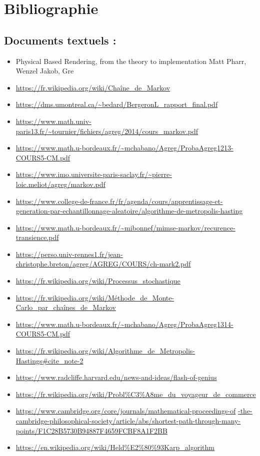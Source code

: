 \documentclass{article}
\begin{document}
\newpage
\section{Bibliographie}

\subsection{Documents textuels :}
\begin{itemize}
    \item Physical Based Rendering, from the theory to implementation Matt Pharr, Wenzel Jakob, Gre
    \item \url{https://fr.wikipedia.org/wiki/Chaîne_de_Markov}
    \item \url{https://dms.umontreal.ca/~bedard/BergeronL_rapport_final.pdf}
    \item \url{https://www.math.univ-paris13.fr/~tournier/fichiers/agreg/2014/cours_markov.pdf}
    \item \url{https://www.math.u-bordeaux.fr/~mchabano/Agreg/ProbaAgreg1213-COURS5-CM.pdf}
    \item \url{https://www.imo.universite-paris-saclay.fr/~pierre-loic.meliot/agreg/markov.pdf}
    \item \url{https://www.college-de-france.fr/fr/agenda/cours/apprentissage-et-generation-par-echantillonnage-aleatoire/algorithme-de-metropolis-hasting}
    \item \url{https://www.math.u-bordeaux.fr/~mibonnef/mimse-markov/recurence-transience.pdf}
    \item \url{https://perso.univ-rennes1.fr/jean-christophe.breton/agreg/AGREG/COURS/ch-mark2.pdf}
    \item \url{https://fr.wikipedia.org/wiki/Processus_stochastique}
    \item \url{https://fr.wikipedia.org/wiki/Méthode_de_Monte-Carlo_par_chaînes_de_Markov}
    \item \url{https://www.math.u-bordeaux.fr/~mchabano/Agreg/ProbaAgreg1314-COURS5-CM.pdf}
    \item \url{https://fr.wikipedia.org/wiki/Algorithme_de_Metropolis-Hastings#cite_note-2}
    \item \url{https://www.radcliffe.harvard.edu/news-and-ideas/flash-of-genius}
    \item \url{https://fr.wikipedia.org/wiki/Probl\%C3\%A8me_du_voyageur_de_commerce}
    \item \url{https://www.cambridge.org/core/journals/mathematical-proceedings-of} \url{-the-cambridge-philosophical-society/article/abs/shortest-path-through-many-points/F1C28B5730B94887F4659FCBF8A1F2BB} \\ %
    \item \url{https://en.wikipedia.org/wiki/Held%E2%80%93Karp_algorithm}
\end{itemize}
\end{document}
